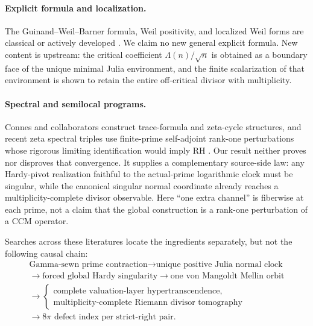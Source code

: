 \documentclass[11pt]{article}
\theoremstyle{definition}
\theoremstyle{remark}
\begin{document}
\paragraph{Explicit formula and localization.}
The Guinand--Weil--Barner formula, Weil positivity, and localized Weil forms are classical or
actively developed \cite{Guinand1949,Weil1952,Barner1981,Bombieri2000,Bombieri2003,Suzuki2026}.
We claim no new general explicit formula.  New content is upstream: the critical coefficient
\(\Lambda(n)/\sqrt n\) is obtained as a boundary face of the unique minimal Julia environment,
and the finite scalarization of that environment is shown to retain the entire off-critical
divisor with multiplicity.

\paragraph{Spectral and semilocal programs.}
Connes and collaborators construct trace-formula and zeta-cycle structures, and recent zeta
spectral triples use finite-prime self-adjoint rank-one perturbations whose rigorous limiting
identification would imply RH
\cite{Connes1999,ConnesConsani2021,ConnesConsani2023,CCM2025}.
Our result neither proves nor disproves that convergence.  It supplies a complementary
source-side law: any Hardy-pivot realization faithful to the actual-prime logarithmic clock must
be singular, while the canonical singular normal coordinate already reaches a
multiplicity-complete divisor observable.  Here ``one extra channel'' is fiberwise at each
prime, not a claim that the global construction is a rank-one perturbation of a CCM operator.

Searches across these literatures locate the ingredients separately, but not the following
causal chain:
\[
\boxed{
\begin{gathered}
\text{Gamma-sewn prime contraction}
\longrightarrow
\text{unique positive Julia normal clock}\\
\longrightarrow
\text{forced global Hardy singularity}
\longrightarrow
\text{one von Mangoldt Mellin orbit}\\
\longrightarrow
\begin{cases}
\text{complete valuation-layer hypertranscendence},\\
\text{multiplicity-complete Riemann divisor tomography}
\end{cases}\\
\longrightarrow
\text{\(8\pi\) defect index per strict-right pair}.
\end{gathered}}
\]
\end{document}
